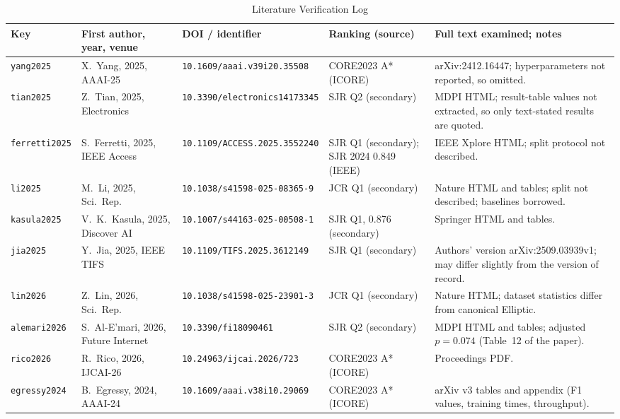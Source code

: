 \documentclass[11pt,a4paper]{article}
\begin{document}
\begin{table}[htbp]
\centering
\scriptsize
\caption{Literature Verification Log}
\label{tab:verification_log}
\begin{tabularx}{\textwidth}{L{1.7cm} L{2.9cm} L{2.6cm} L{2.3cm} X}
\toprule
\textbf{Key} & \textbf{First author, year, venue} & \textbf{DOI / identifier} & \textbf{Ranking (source)} & \textbf{Full text examined; notes} \\
\midrule
\texttt{yang2025} & X.~Yang, 2025, AAAI-25 & \nolinkurl{10.1609/aaai.v39i20.35508} & CORE2023 A* (ICORE) & arXiv:2412.16447; hyperparameters not reported, so omitted. \\
\texttt{tian2025} & Z.~Tian, 2025, Electronics & \nolinkurl{10.3390/electronics14173345} & SJR Q2 (secondary) & MDPI HTML; result-table values not extracted, so only text-stated results are quoted. \\
\texttt{ferretti2025} & S.~Ferretti, 2025, IEEE Access & \nolinkurl{10.1109/ACCESS.2025.3552240} & SJR Q1 (secondary); SJR 2024 0.849 (IEEE) & IEEE Xplore HTML; split protocol not described. \\
\texttt{li2025} & M.~Li, 2025, Sci.\ Rep. & \nolinkurl{10.1038/s41598-025-08365-9} & JCR Q1 (secondary) & Nature HTML and tables; split not described; baselines borrowed. \\
\texttt{kasula2025} & V.~K.~Kasula, 2025, Discover AI & \nolinkurl{10.1007/s44163-025-00508-1} & SJR Q1, 0.876 (secondary) & Springer HTML and tables. \\
\texttt{jia2025} & Y.~Jia, 2025, IEEE TIFS & \nolinkurl{10.1109/TIFS.2025.3612149} & SJR Q1 (secondary) & Authors' version arXiv:2509.03939v1; may differ slightly from the version of record. \\
\texttt{lin2026} & Z.~Lin, 2026, Sci.\ Rep. & \nolinkurl{10.1038/s41598-025-23901-3} & JCR Q1 (secondary) & Nature HTML; dataset statistics differ from canonical Elliptic. \\
\texttt{alemari2026} & S.~Al-E'mari, 2026, Future Internet & \nolinkurl{10.3390/fi18090461} & SJR Q2 (secondary) & MDPI HTML and tables; adjusted $p=0.074$ (Table~12 of the paper). \\
\texttt{rico2026} & R.~Rico, 2026, IJCAI-26 & \nolinkurl{10.24963/ijcai.2026/723} & CORE2023 A* (ICORE) & Proceedings PDF. \\
\midrule
\texttt{egressy2024} & B.~Egressy, 2024, AAAI-24 & \nolinkurl{10.1609/aaai.v38i10.29069} & CORE2023 A* (ICORE) & arXiv v3 tables and appendix (F1 values, training times, throughput). \\

\end{tabularx}
\end{table}
\end{document}

